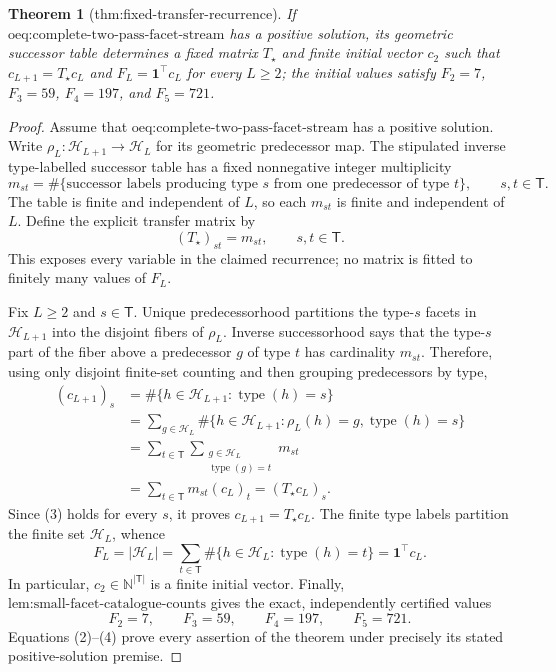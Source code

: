 \documentclass{article}
\newtheorem{theorem}{Theorem}
\begin{document}
\begin{theorem}[thm:fixed-transfer-recurrence]\label{thm:fixed-transfer-recurrence}
If \(\text{oeq:complete-two-pass-facet-stream}\) has a positive solution, its geometric successor table determines a fixed matrix \(T_\star\) and finite initial vector \(c_2\) such that \(c_{L+1}=T_\star c_L\) and \(F_L=\mathbf 1^\top c_L\) for every \(L\ge2\); the initial values satisfy \(F_2=7\), \(F_3=59\), \(F_4=197\), and \(F_5=721\).
\end{theorem}
\begin{proof}
Assume that \(\text{oeq:complete-two-pass-facet-stream}\) has a positive solution.  Write \(\rho_L:\mathcal H_{L+1}\to\mathcal H_L\) for its geometric predecessor map.  The stipulated inverse type-labelled successor table has a fixed nonnegative integer multiplicity
\[
m_{st}=\#\{\text{successor labels producing type }s
                 \text{ from one predecessor of type }t\},
\qquad s,t\in\mathsf T.
\]
The table is finite and independent of \(L\), so each \(m_{st}\) is finite and independent of \(L\).  Define the explicit transfer matrix by
\[
(T_\star)_{st}=m_{st},\qquad s,t\in\mathsf T. \tag{2}
\]
This exposes every variable in the claimed recurrence; no matrix is fitted to finitely many values of \(F_L\).

Fix \(L\ge2\) and \(s\in\mathsf T\).  Unique predecessorhood partitions the type-\(s\) facets in \(\mathcal H_{L+1}\) into the disjoint fibers of \(\rho_L\).  Inverse successorhood says that the type-\(s\) part of the fiber above a predecessor \(g\) of type \(t\) has cardinality \(m_{st}\).  Therefore, using only disjoint finite-set counting and then grouping predecessors by type,
\[
\begin{aligned}
(c_{L+1})_s
&=\#\{h\in\mathcal H_{L+1}:\operatorname{type}(h)=s\}\\
&=\sum_{g\in\mathcal H_L}
   \#\{h\in\mathcal H_{L+1}:\rho_L(h)=g,
                  \operatorname{type}(h)=s\}\\
&=\sum_{t\in\mathsf T}
   \sum_{\substack{g\in\mathcal H_L\\\operatorname{type}(g)=t}}m_{st}\\
&=\sum_{t\in\mathsf T}m_{st}(c_L)_t
=(T_\star c_L)_s.
\end{aligned}\tag{3}
\]
Since (3) holds for every \(s\), it proves \(c_{L+1}=T_\star c_L\).  The finite type labels partition the finite set \(\mathcal H_L\), whence
\[
F_L=|\mathcal H_L|
=\sum_{t\in\mathsf T}\#\{h\in\mathcal H_L:\operatorname{type}(h)=t\}
=\mathbf 1^\top c_L. \tag{4}
\]
In particular, \(c_2\in\mathbb N^{|\mathsf T|}\) is a finite initial vector.  Finally, \(\text{lem:small-facet-catalogue-counts}\) gives the exact, independently certified values
\[
F_2=7,\qquad F_3=59,\qquad F_4=197,\qquad F_5=721.
\]
Equations (2)--(4) prove every assertion of the theorem under precisely its stated positive-solution premise.
\end{proof}
\end{document}
